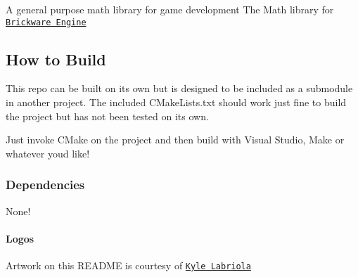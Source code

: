  

A general purpose math library for game development The Math library for \href{http://github.com/Honeybunch/Brickware-Engine}{\tt Brickware Engine} 



\subsection*{How to Build}

This repo can be built on its own but is designed to be included as a submodule in another project. The included C\+Make\+Lists.\+txt should work just fine to build the project but has not been tested on its own.

Just invoke C\+Make on the project and then build with Visual Studio, Make or whatever you\textquotesingle{}d like!

\subsubsection*{Dependencies}

None!

\paragraph*{Logos}

Artwork on this R\+E\+A\+D\+M\+E is courtesy of \href{http://www.kylelabriola.com/}{\tt Kyle Labriola} 